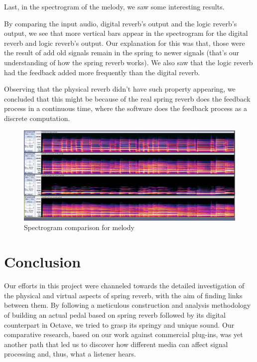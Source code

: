 \documentclass[12pt]{article}
\begin{document}
\newpage


Last, in the spectrogram of the melody, we saw some interesting results.

By comparing the input audio, digital reverb's output and the logic reverb's output, we see that more vertical bars appear in the spectrogram for the digital reverb and logic reverb's output. Our explanation for this was that, those were the result of add old signals remain in the spring to newer signals (that's our understanding of how the spring reverb works). We also saw that the logic reverb had the feedback added more frequently than the digital reverb.

Observing that the physical reverb didn't have such property appearing, we concluded that this might be because of the real spring reverb does the feedback process in a continuous time, where the software does the feedback process as a discrete computation.

\begin{figure}[h]
	\center
	\includegraphics[width=\linewidth]{audio_comparison/melody_comparison_spec.png}
	\caption{Spectrogram comparison for melody}
\end{figure}


\newpage
\section{Conclusion}

Our efforts in this project were channeled towards the detailed investigation of the physical and virtual aspects of spring reverb, with the aim of finding links between them. By following a meticulous construction and analysis methodology of building an actual pedal based on spring reverb followed by its digital counterpart in Octave, we tried to grasp its springy and unique sound. Our comparative research, based on our work against commercial plug-ins, was yet another path that led us to discover how different media can affect signal processing and, thus, what a listener hears.
\end{document}
